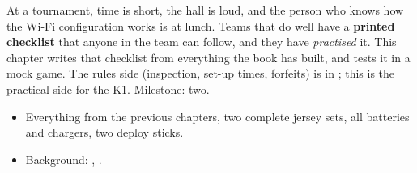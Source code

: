 \label{k:match}

At a tournament, time is short, the hall is loud, and the person who knows how the Wi-Fi configuration works is at lunch. Teams that do well have a \textbf{printed checklist} that anyone in the team can follow, and they have \emph{practised} it. This chapter writes that checklist from everything the book has built, and tests it in a mock game. The rules side (inspection, set-up times, forfeits) is in ; this is the practical side for the K1. Milestone: two.

\begin{needbox}
\begin{itemize}[nosep]
  \item Everything from the previous chapters, two complete jersey sets, all batteries and chargers, two deploy sticks.
  \item Background: , .
\end{itemize}
\end{needbox}

